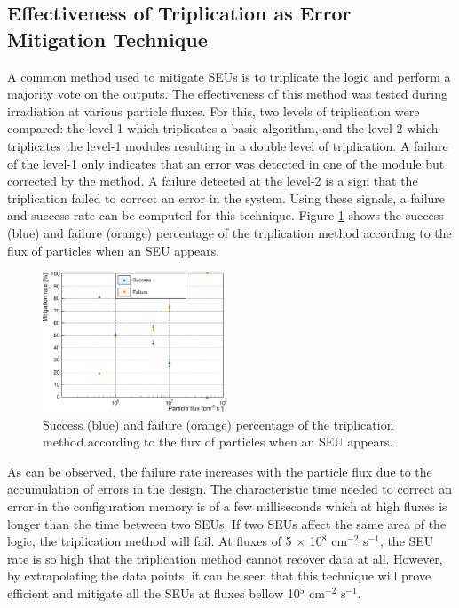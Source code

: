     \subsection{Effectiveness of Triplication as Error Mitigation Technique}

      A common method used to mitigate SEUs is to triplicate the logic and perform a majority vote on the outputs. The effectiveness of this method was tested during irradiation at various particle fluxes. For this, two levels of triplication were compared: the level-1 which triplicates a basic algorithm, and the level-2 which triplicates the level-1 modules resulting in a double level of triplication. A failure of the level-1 only indicates that an error was detected in one of the module but corrected by the method. A failure detected at the level-2 is a sign that the triplication failed to correct an error in the system. Using these signals, a failure and success rate can be computed for this technique. Figure \ref{fig:II-5-data-triplication} shows the success (blue) and failure (orange) percentage of the triplication method according to the flux of particles when an SEU appears. \\

      \begin{figure}[h!]
        \centering
        \includegraphics[width=0.49\textwidth]{img/plots/c_l-crop}
        \caption{Success (blue) and failure (orange) percentage of the triplication method according to the flux of particles when an SEU appears.}
        \label{fig:II-5-data-triplication}
      \end{figure}

      As can be observed, the failure rate increases with the particle flux due to the accumulation of errors in the design. The characteristic time needed to correct an error in the configuration memory is of a few milliseconds which at high fluxes is longer than the time between two SEUs. If two SEUs affect the same area of the logic, the triplication method will fail. At fluxes of 5 $ \times $ 10$^8$ cm$^{-2}$ s$^{-1}$, the SEU rate is so high that the triplication method cannot recover data at all. However, by extrapolating the data points, it can be seen that this technique will prove efficient and mitigate all the SEUs at fluxes bellow 10$^5$ cm$^{-2}$ s$^{-1}$.

